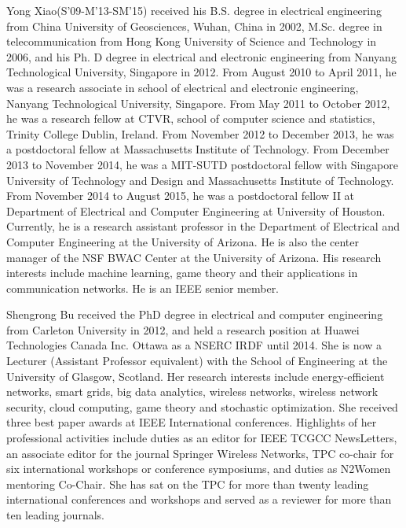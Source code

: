 \documentclass[twocolumn,10pt]{IEEEtran}
\begin{document}
\begin{IEEEbiography}{Yong Xiao}(S'09-M'13-SM'15) received his B.S. degree in electrical engineering from China University of Geosciences, Wuhan, China in 2002, M.Sc. degree in telecommunication from Hong Kong University of Science and Technology in 2006, and his Ph. D degree in electrical and electronic engineering from Nanyang Technological University, Singapore in 2012. From August 2010 to April 2011, he was a research associate in school of electrical and electronic engineering, Nanyang Technological University, Singapore. From May 2011 to October 2012, he was a research fellow at CTVR, school of computer science and statistics, Trinity College Dublin, Ireland. From November 2012 to December 2013, he was a postdoctoral fellow at Massachusetts Institute of Technology. From December 2013 to November 2014, he was a MIT-SUTD postdoctoral fellow with Singapore University of Technology and Design and Massachusetts Institute of Technology. From November 2014 to August 2015, he was a postdoctoral fellow II at Department of Electrical and Computer Engineering at University of Houston. Currently, he is a research assistant professor in the Department of Electrical and Computer Engineering at the University of Arizona. He is also the center manager of the NSF BWAC Center at the University of Arizona. His research interests include machine learning, game theory and their applications in communication networks. He is an IEEE senior member.
\end{IEEEbiography}


\begin{IEEEbiography}{Shengrong Bu} received the PhD degree in electrical and computer engineering from Carleton University in 2012, and held a research position at Huawei Technologies Canada Inc. Ottawa as a NSERC IRDF until 2014. She is now a Lecturer (Assistant Professor equivalent) with the School of Engineering at the University of Glasgow, Scotland. Her research interests include energy-efficient networks, smart grids, big data analytics, wireless networks, wireless network security, cloud computing, game theory and stochastic optimization. She received three best paper awards at IEEE International conferences. Highlights of her professional activities include duties as an editor for IEEE TCGCC NewsLetters, an associate editor for the journal Springer Wireless Networks, TPC co-chair for six international workshops or conference symposiums, and duties as N2Women mentoring Co-Chair. She has sat on the TPC for more than twenty leading international conferences and workshops and served as a reviewer for more than ten leading journals.
\end{IEEEbiography}
\end{document}
